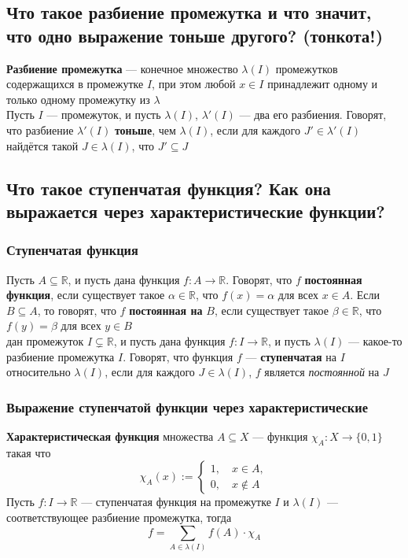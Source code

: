 \documentclass[a4paper]{article}
\begin{document}
\subsection{Что такое разбиение промежутка и что значит, что одно выражение тоньше другого? (тонкота!)}
\label{1.11}
\textbf{Разбиение промежутка} — конечное множество $\lambda(I)$ промежутков содержащихся в промежутке $I$, при этом любой $x \in I$ принадлежит одному и только одному промежутку из $\lambda$\\[2mm]
\indent Пусть $I$ — промежуток, и пусть $\lambda(I)$, $\lambda'(I)$ — два его разбиения. Говорят, что разбиение $\lambda'(I)$ \textbf{тоньше}, чем $\lambda(I)$, если для каждого $J' \in \lambda'(I)$ найдётся такой $J \in \lambda(I)$, что $J' \subseteq J$

\subsection{Что такое ступенчатая функция? Как она выражается через характеристические функции?}
\subsubsection*{Ступенчатая функция}
Пусть $A \subseteq \mathbb{R}$, и пусть дана функция $f: A \to \mathbb{R}$. Говорят, что $f$ \textbf{постоянная функция}, если существует такое $\alpha \in \mathbb{R}$, что $f(x) = \alpha$ для всех $x \in A$. Если $B \subseteq A$, то говорят, что $f$ \textbf{постоянная на} $B$, если существует такое $\beta \in \mathbb{R}$, что $f(y) = \beta$ для всех $y \in B$\\[2mm]
 дан промежуток $I \subsetneq \mathbb{R}$, и пусть дана функция $f: I \to \mathbb{R}$, и пусть $\lambda(I)$ — какое-то разбиение промежутка $I$. Говорят, что функция $f$ — \textbf{ступенчатая} на $I$ относительно $\lambda(I)$, если для каждого $J \in \lambda(I)$, $f$ является \textit{постоянной} на $J$
\subsubsection*{Выражение ступенчатой функции через характеристические}
\textbf{Характеристическая функция} множества $A\subseteq X$ — функция $\chi_A:X\rightarrow\{0,1\}$ такая что
\begin{equation*}
    \chi_A(x):=\begin{cases}
        1,\quad x\in A,\\
        0,\quad x\notin A
    \end{cases}
\end{equation*}
\indent Пусть $f:I\rightarrow\mathbb{R}$ — ступенчатая функция на промежутке $I$ и $\lambda(I)$ — соответствующее разбиение промежутка, тогда
$$\boxed{f=\sum_{A\in\lambda(I)}f(A)\cdot\chi_A}$$
\end{document}
